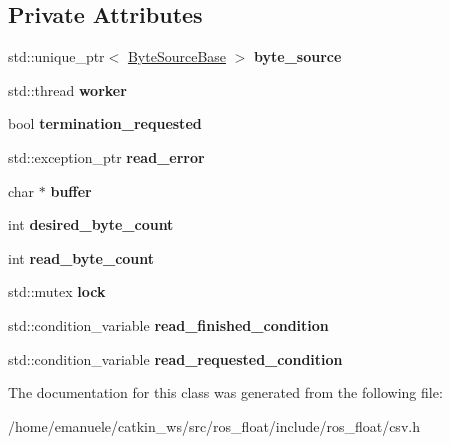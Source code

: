 \subsection*{Private Attributes}
\begin{DoxyCompactItemize}
\item 
\mbox{\label{classio_1_1detail_1_1AsynchronousReader_a6fd9551f8df07ec6a9ce32f8f33b362d}} 
std\+::unique\+\_\+ptr$<$ \hyperlink{classio_1_1ByteSourceBase}{Byte\+Source\+Base} $>$ {\bfseries byte\+\_\+source}
\item 
\mbox{\label{classio_1_1detail_1_1AsynchronousReader_a729cf01cc703a42b6010dd5bec4a14f2}} 
std\+::thread {\bfseries worker}
\item 
\mbox{\label{classio_1_1detail_1_1AsynchronousReader_a63031e519f616e839031529872bfa164}} 
bool {\bfseries termination\+\_\+requested}
\item 
\mbox{\label{classio_1_1detail_1_1AsynchronousReader_a6cb2b4a80454dc3b459a378693423a78}} 
std\+::exception\+\_\+ptr {\bfseries read\+\_\+error}
\item 
\mbox{\label{classio_1_1detail_1_1AsynchronousReader_a1b755d751a33453ddaff7974bed29434}} 
char $\ast$ {\bfseries buffer}
\item 
\mbox{\label{classio_1_1detail_1_1AsynchronousReader_a9bde5d9c5268af659cbb623bea6715fe}} 
int {\bfseries desired\+\_\+byte\+\_\+count}
\item 
\mbox{\label{classio_1_1detail_1_1AsynchronousReader_ab7aa18093deb7ae67f1c0a699dd4ef93}} 
int {\bfseries read\+\_\+byte\+\_\+count}
\item 
\mbox{\label{classio_1_1detail_1_1AsynchronousReader_a4fdba0a72e02dd5168b540795acac35e}} 
std\+::mutex {\bfseries lock}
\item 
\mbox{\label{classio_1_1detail_1_1AsynchronousReader_a1ad4bce56a87bb95bae7a21f927c8db0}} 
std\+::condition\+\_\+variable {\bfseries read\+\_\+finished\+\_\+condition}
\item 
\mbox{\label{classio_1_1detail_1_1AsynchronousReader_aaa5c6c774868149377cde2f8857d223d}} 
std\+::condition\+\_\+variable {\bfseries read\+\_\+requested\+\_\+condition}
\end{DoxyCompactItemize}


The documentation for this class was generated from the following file\+:\begin{DoxyCompactItemize}
\item 
/home/emanuele/catkin\+\_\+ws/src/ros\+\_\+float/include/ros\+\_\+float/csv.\+h\end{DoxyCompactItemize}
